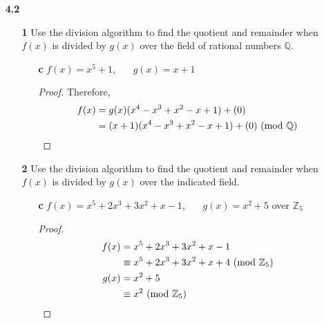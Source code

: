 \documentclass[paper=usletter, fontsize=12pt]{article}
\begin{document}

    \begin{enumerate}

        \item[\textbf{4.2}]
        \begin{enumerate}

            \item[\textbf{1}] Use the division algorithm to find the quotient
            and remainder when $f(x)$ is divided by $g(x)$ over the field of
            rational numbers $\mathbb{Q}$.
            \begin{enumerate}

                \item[\textbf{c}] $f(x) = x^5+1$, \ \ \ $g(x) = x+1$
                \begin{proof}


                    Therefore,
                    \begin{align*}
                        f(x) & = g(x)(x^4-x^3+x^2-x+1) + (0)\\
                        & = (x+1)(x^4-x^3+x^2-x+1) + (0) \ (\mathrm{mod}\ \mathbb{Q}) \qedhere
                    \end{align*}

                \end{proof}

            \end{enumerate}

            \item[\textbf{2}] Use the division algorithm to find the quotient
            and remainder when $f(x)$ is divided by $g(x)$ over the indicated
            field.
            \begin{enumerate}

                \item[\textbf{c}] $f(x) = x^5+2x^3+3x^2+x-1$, \ \ \ $g(x) =
                x^2+5$ over $\mathbb{Z}_5$
                \begin{proof}

                    \begin{align*}
                        f(x)&=x^5+2x^3+3x^2+x-1 \\
                        & \equiv x^5+2x^3+3x^2+x+4 \ (\mathrm{mod}\ \mathbb{Z}_5)\\
                        g(x) &= x^2+5\\
                        &\equiv x^2 \ (\mathrm{mod}\ \mathbb{Z}_5)
                    \end{align*}


\end{proof}
\end{enumerate}
\end{enumerate}
\end{enumerate}
\end{document}
